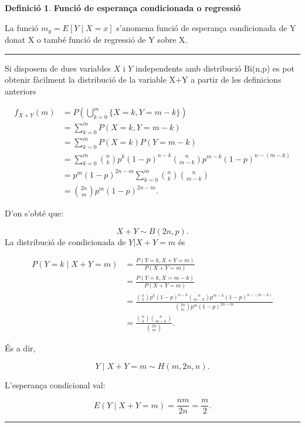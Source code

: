 \documentclass[
  catalan,
]{article}
\theoremstyle{definition}
\newtheorem{definition}{Definició}[section]
\theoremstyle{definition}
\theoremstyle{definition}
\theoremstyle{definition}
\theoremstyle{remark}
\begin{document}
\begin{definition}
\textbf{Funció de esperança condicionada o regressió}

La funció \(m_y =E[Y \mid X=x]\) s'anomena funció de esperança condicionada de Y donat X o també funció de regressió de Y sobre X.
\end{definition}

\begin{center}\rule{0.5\linewidth}{0.5pt}\end{center}

Si disposem de dues variables \(X\) i \(Y\) independents amb distribució Bi(n,p) es pot obtenir fàcilment la distribució de la variable X+Y a partir de les definicions anteriors

\[
\begin{aligned}
f_{X+Y}(m)
&=
P\left(\bigcup_{k=0}^{m}\{X=k,Y=m-k\}\right)\\
&=
\sum_{k=0}^{m}P(X=k,Y=m-k)\\
&=
\sum_{k=0}^{m}P(X=k)P(Y=m-k)\\
&=
\sum_{k=0}^{m}
\binom{n}{k}p^k(1-p)^{n-k}
\binom{n}{m-k}p^{m-k}(1-p)^{n-(m-k)}\\
&=
p^m(1-p)^{2n-m}
\sum_{k=0}^{m}
\binom{n}{k}
\binom{n}{m-k}\\
&=
\binom{2n}{m}p^m(1-p)^{2n-m}.
\end{aligned}
\]

D'on s'obté que:

\[
X+Y\sim B(2n,p).
\]
La distribució de condicionada de \(Y|X+Y=m\) és

\[
\begin{aligned}
P(Y=k\mid X+Y=m)
&=
\frac{P(Y=k,X+Y=m)}
{P(X+Y=m)}\\
&=
\frac{P(Y=k,X=m-k)}
{P(X+Y=m)}\\
&=
\frac{
\binom{n}{k}p^k(1-p)^{n-k}
\binom{n}{m-k}p^{m-k}(1-p)^{n-(m-k)}
}
{
\binom{2n}{m}p^m(1-p)^{2n-m}
}\\
&=
\frac{
\binom{n}{k}\binom{n}{m-k}
}
{
\binom{2n}{m}
}.
\end{aligned}
\]

És a dir,

\[
Y\mid X+Y=m \sim H(m,2n,n).
\]

L'esperança condicional val:

\[
E(Y\mid X+Y=m)=\frac{nm}{2n}=\frac{m}{2}.
\]

\begin{center}\rule{0.5\linewidth}{0.5pt}\end{center}
\end{document}
